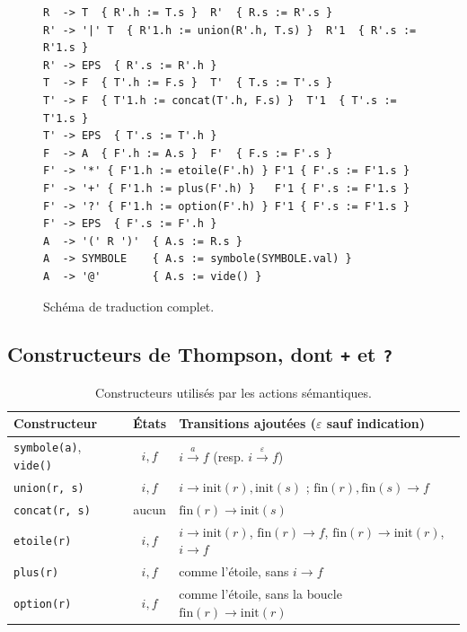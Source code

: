 \documentclass[12pt,a4paper]{article}
\newcommand{\code}[1]{{\fontsize{10}{12}\selectfont\texttt{#1}}}
\newcommand{\eps}{\ensuremath{\varepsilon}}
\begin{document}
\begin{figure}[htb]
\begin{lstlisting}[style=schema]
R  -> T  { R'.h := T.s }  R'  { R.s := R'.s }
R' -> '|' T  { R'1.h := union(R'.h, T.s) }  R'1  { R'.s := R'1.s }
R' -> EPS  { R'.s := R'.h }
T  -> F  { T'.h := F.s }  T'  { T.s := T'.s }
T' -> F  { T'1.h := concat(T'.h, F.s) }  T'1  { T'.s := T'1.s }
T' -> EPS  { T'.s := T'.h }
F  -> A  { F'.h := A.s }  F'  { F.s := F'.s }
F' -> '*' { F'1.h := etoile(F'.h) } F'1 { F'.s := F'1.s }
F' -> '+' { F'1.h := plus(F'.h) }   F'1 { F'.s := F'1.s }
F' -> '?' { F'1.h := option(F'.h) } F'1 { F'.s := F'1.s }
F' -> EPS  { F'.s := F'.h }
A  -> '(' R ')'  { A.s := R.s }
A  -> SYMBOLE    { A.s := symbole(SYMBOLE.val) }
A  -> '@'        { A.s := vide() }
\end{lstlisting}
\caption{Schéma de traduction complet.}\label{fig:schema}
\end{figure}

\subsection{Constructeurs de Thompson, dont \texttt{+} et \texttt{?}}\label{sec:constructeurs}

\begin{table}[H]
\centering\small
\begin{tabularx}{\linewidth}{l c L}
\toprule
Constructeur & États & Transitions ajoutées (\eps{} sauf indication) \\
\midrule
\code{symbole(a)}, \code{vide()} & $i, f$ & $i \xrightarrow{a} f$ (resp. $i \xrightarrow{\varepsilon} f$) \\
\code{union(r, s)}  & $i, f$ & $i \to \mathrm{init}(r), \mathrm{init}(s)$ ; $\mathrm{fin}(r), \mathrm{fin}(s) \to f$ \\
\code{concat(r, s)} & aucun  & $\mathrm{fin}(r) \to \mathrm{init}(s)$ \\
\code{etoile(r)}    & $i, f$ & $i \to \mathrm{init}(r)$, $\mathrm{fin}(r) \to f$, $\mathrm{fin}(r) \to \mathrm{init}(r)$, $i \to f$ \\
\code{plus(r)}      & $i, f$ & comme l'étoile, sans $i \to f$ \\
\code{option(r)}    & $i, f$ & comme l'étoile, sans la boucle $\mathrm{fin}(r) \to \mathrm{init}(r)$ \\
\bottomrule
\end{tabularx}
\caption{Constructeurs utilisés par les actions sémantiques.}
\end{table}
\end{document}
